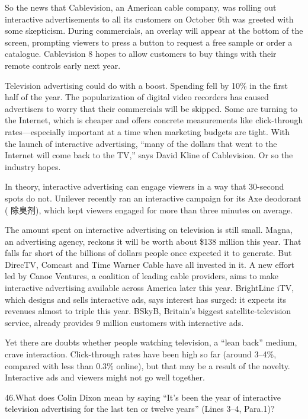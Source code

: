 \documentclass[UTF8,11pt]{ctexart}
\begin{document}
So the news that Cablevision, an American cable company, was rolling out interactive advertisements to all its customers on October 6th was greeted with some skepticism. During commercials, an overlay will appear at the bottom of the screen, prompting viewers to press a button to request a free sample or order a catalogue. Cablevision 8 hopes to allow customers to buy things with their remote controls early next year.


Television advertising could do with a boost. Spending fell by 10\% in the first half of the year. The popularization of digital video recorders has caused advertisers to worry that their commercials will be skipped. Some are turning to the Internet, which is cheaper and offers concrete measurements like click-through rates—especially important at a time when marketing budgets are tight. With the launch of interactive advertising, “many of the dollars that went to the Internet will come back to the TV,” says David Kline of Cablevision. Or so the industry hopes.


In theory, interactive advertising can engage viewers in a way that 30-second spots do not. Unilever recently ran an interactive campaign for its Axe deodorant ( 除臭剂), which kept viewers engaged for more than three minutes on average.


The amount spent on interactive advertising on television is still small. Magna, an advertising agency, reckons it will be worth about \$138 million this year. That falls far short of the billions of dollars people once expected it to generate. But DirecTV, Comcast and Time Warner Cable have all invested in it. A new effort led by Canoe Ventures, a coalition of leading cable providers, aims to make interactive advertising available across America later this year. BrightLine iTV, which designs and sells interactive ads, says interest has surged: it expects its revenues almost to triple this year. BSkyB, Britain’s biggest satellite-television service, already provides 9 million customers with interactive ads.


Yet there are doubts whether people watching television, a “lean back” medium, crave interaction. Click-through rates have been high so far (around 3–4\%, compared with less than 0.3\% online), but that may be a result of the novelty. Interactive ads and viewers might not go well together.


46.What does Colin Dixon mean by saying “It’s been the year of interactive television advertising for the last ten or twelve years” (Lines 3–4, Para.1)?
\end{document}

